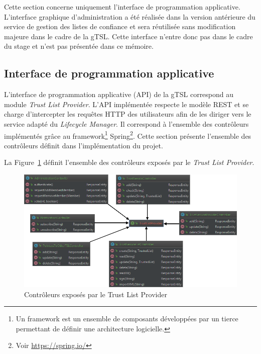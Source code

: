 \documentclass{tnreport}
\begin{document}
Cette section concerne uniquement l'interface de programmation applicative. L'interface graphique d'administration a été réalisée dans la version antérieure du service de gestion des listes de confiance et sera réutilisée sans modification majeure dans le cadre de la gTSL. Cette interface n'entre donc pas dans le cadre du stage et n'est pas présentée dans ce mémoire.

\subsection{Interface de programmation applicative}

L'interface de programmation applicative (API) de la gTSL correspond au module \textit{Trust List Provider}. L'API implémentée respecte le modèle REST et se charge d'intercepter les requêtes HTTP des utilisateurs afin de les diriger vers le service adapté du \textit{Lifecycle Manager}. Il correspond à l'ensemble des contrôleurs implémentés grâce au framework\footnote{Un framework est un ensemble de composants développées par un tierce permettant de définir une architecture logicielle.} Spring\footnote{Voir \url{https://spring.io/}}. Cette section présente l'ensemble des contrôleurs définit dans l'implémentation du projet.

La Figure~\ref{fig:rest-controllers} définit l'ensemble des contrôleurs exposés par le \textit{Trust List Provider}.

\clearpage
\begin{figure}[h]
	\centering
	\includegraphics[scale=0.73]{figures/rest-controllers}
	\caption{Contrôleurs exposés par le Trust List Provider}
	\label{fig:rest-controllers}
\end{figure}
\end{document}
